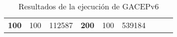 \begin{table}[H]
\begin{tabular}{|ccrccrccc}
\multicolumn{1}{|c|}{\multirow{-39}{*}{\cellcolor[HTML]{FFFFC7}\textbf{100}}} & \multicolumn{1}{c|}{\multirow{-9}{*}{\cellcolor[HTML]{DDFDFF}100}} & \multicolumn{1}{r|}{\cellcolor[HTML]{DAE8FC}112587}    & \multicolumn{1}{c|}{\multirow{-39}{*}{\cellcolor[HTML]{FFFFC7}\textbf{200}}} & \multicolumn{1}{c|}{\multirow{-10}{*}{\cellcolor[HTML]{DDFDFF}100}} & \multicolumn{1}{r|}{\cellcolor[HTML]{DDFDFF}539184}    &                                                                              &                                                                    &                                                        \\ \cline{1-6}
\end{tabular}
\caption{\label{res:GACEPv6}Resultados de la ejecución de GACEPv6}
\end{table}

